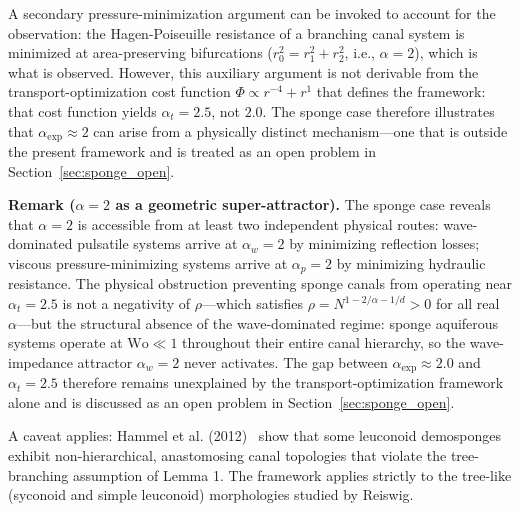 \documentclass[11pt,a4paper]{article}
\theoremstyle{remark}
\begin{document}
A secondary pressure-minimization argument can be invoked to account for the
observation: the Hagen-Poiseuille resistance of a branching canal system is
minimized at area-preserving bifurcations ($r_0^2 = r_1^2 + r_2^2$,
i.e., $\alpha = 2$), which is what is observed. However, this auxiliary
argument is not derivable from the transport-optimization cost function
$\Phi \propto r^{-4} + r^1$ that defines the framework: that cost function
yields $\alpha_t = 2.5$, not $2.0$. The sponge case therefore illustrates
that $\alpha_{\exp} \approx 2$ can arise from a physically distinct
mechanism---one that is outside the present framework and is treated as an
open problem in Section~\ref{sec:sponge_open}.

\noindent\textbf{Remark ($\alpha = 2$ as a geometric super-attractor).} The sponge case reveals that $\alpha = 2$ is accessible from at least two independent physical routes: wave-dominated pulsatile systems arrive at $\alpha_w = 2$ by minimizing reflection losses; viscous pressure-minimizing systems arrive at $\alpha_p = 2$ by minimizing hydraulic resistance. The physical obstruction preventing sponge canals from operating near $\alpha_t = 2.5$ is not a negativity of $\rho$---which satisfies $\rho = N^{1-2/\alpha-1/d} > 0$ for all real $\alpha$---but the structural absence of the wave-dominated regime: sponge aquiferous systems operate at $\mathrm{Wo} \ll 1$ throughout their entire canal hierarchy, so the wave-impedance attractor $\alpha_w = 2$ never activates. The gap between $\alpha_{\exp} \approx 2.0$ and $\alpha_t = 2.5$ therefore remains unexplained by the transport-optimization framework alone and is discussed as an open problem in Section~\ref{sec:sponge_open}.

A caveat applies: Hammel et al. (2012)~\cite{hammel2012} show that some
leuconoid demosponges exhibit non-hierarchical, anastomosing canal topologies
that violate the tree-branching assumption of Lemma 1. The framework applies
strictly to the tree-like (syconoid and simple leuconoid) morphologies studied
by Reiswig.
\end{document}
